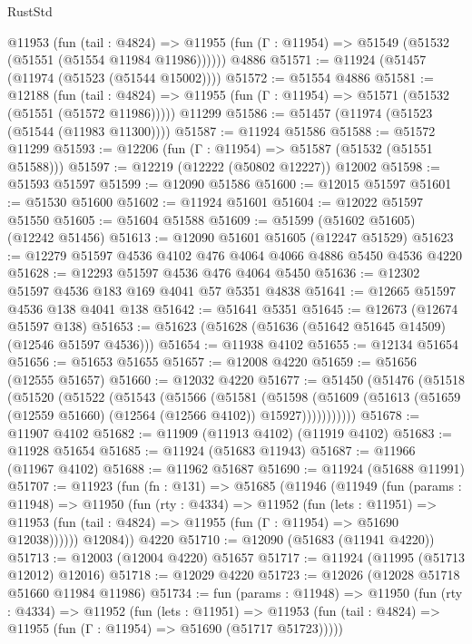 \begin{lexlean}{RustStd}
\begin{coremodule}
{\begin{coremodule}
{{{{{{{{{{{{{{{{{{{{{{{{{{{{{{{{{{{{{{{{{{{{{{{{{{{{{{{{{{{{{{{{{{{{{{{{{{{{{{{{    @11953
      (fun (tail : @4824) =>
      @11955 (fun (Γ : @11954) => @51549 (@51532 (@51551 (@51554 @11984 @11986))))))
    @4886
@51571 := @11924 (@51457 (@11974 (@51523 (@51544 @15002))))
@51572 := @51554 @4886
@51581 := @12188
    (fun (tail : @4824) => @11955 (fun (Γ : @11954) => @51571 (@51532 (@51551 (@51572 @11986)))))
    @11299
@51586 := @51457 (@11974 (@51523 (@51544 (@11983 @11300))))
@51587 := @11924 @51586
@51588 := @51572 @11299
@51593 := @12206 (fun (Γ : @11954) => @51587 (@51532 (@51551 @51588)))
@51597 := @12219 (@12222 (@50802 @12227)) @12002
@51598 := @51593 @51597
@51599 := @12090 @51586
@51600 := @12015 @51597
@51601 := @51530 @51600
@51602 := @11924 @51601
@51604 := @12022 @51597 @51550
@51605 := @51604 @51588
@51609 := @51599 (@51602 @51605) (@12242 @51456)
@51613 := @12090 @51601 @51605 (@12247 @51529)
@51623 := @12279 @51597 @4536 @4102 @476 @4064 @4066 @4886 @5450 @4536 @4220
@51628 := @12293 @51597 @4536 @476 @4064 @5450
@51636 := @12302 @51597 @4536 @183 @169 @4041 @57 @5351 @4838
@51641 := @12665 @51597 @4536 @138 @4041 @138
@51642 := @51641 @5351
@51645 := @12673 (@12674 @51597 @138)
@51653 := @51623 (@51628 (@51636 (@51642 @51645 @14509) (@12546 @51597 @4536)))
@51654 := @11938 @4102
@51655 := @12134 @51654
@51656 := @51653 @51655
@51657 := @12008 @4220
@51659 := @51656 (@12555 @51657)
@51660 := @12032 @4220
@51677 := @51450
    (@51476
      (@51518
        (@51520
          (@51522
            (@51543
              (@51566
                (@51581
                  (@51598
                    (@51609
                      (@51613 (@51659 (@12559 @51660) (@12564 (@12566 @4102)) @15927)))))))))))
@51678 := @11907 @4102
@51682 := @11909 (@11913 @4102) (@11919 @4102)
@51683 := @11928 @51654
@51685 := @11924 (@51683 @11943)
@51687 := @11966 (@11967 @4102)
@51688 := @11962 @51687
@51690 := @11924 (@51688 @11991)
@51707 := @11923
    (fun (fn : @131) =>
    @51685
      (@11946
        (@11949
          (fun (params : @11948) =>
          @11950
            (fun (rty : @4334) =>
            @11952
              (fun (lets : @11951) =>
              @11953 (fun (tail : @4824) => @11955 (fun (Γ : @11954) => @51690 @12038))))))
        @12084))
    @4220
@51710 := @12090 (@51683 (@11941 @4220))
@51713 := @12003 (@12004 @4220) @51657
@51717 := @11924 (@11995 (@51713 @12012) @12016)
@51718 := @12029 @4220
@51723 := @12026 (@12028 @51718 @51660 @11984 @11986)
@51734 := fun (params : @11948) =>
  @11950
    (fun (rty : @4334) =>
    @11952
      (fun (lets : @11951) =>
      @11953 (fun (tail : @4824) => @11955 (fun (Γ : @11954) => @51690 (@51717 @51723)))))
}}}}}}}}}}}}}}}}}}}}}}}}}}}}}}}}}}}}}}}}}}}}}}}}}}}}}}}}}}}}}}}}}}}}}}}}}}}}}}}}
\end{coremodule}}
\end{coremodule}
\end{lexlean}
